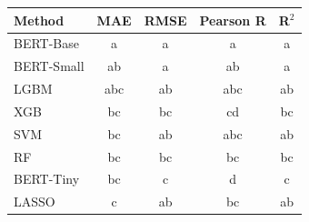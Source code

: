 \begin{tabular}{lcccc}
\toprule
Method & MAE & RMSE & Pearson R & R$^2$ \\
\midrule
BERT-Base & a & a & a & a \\
BERT-Small & ab & a & ab & a \\
LGBM & abc & ab & abc & ab \\
XGB & bc & bc & cd & bc \\
SVM & bc & ab & abc & ab \\
RF & bc & bc & bc & bc \\
BERT-Tiny & bc & c & d & c \\
LASSO & c & ab & bc & ab \\
\bottomrule
\end{tabular}
